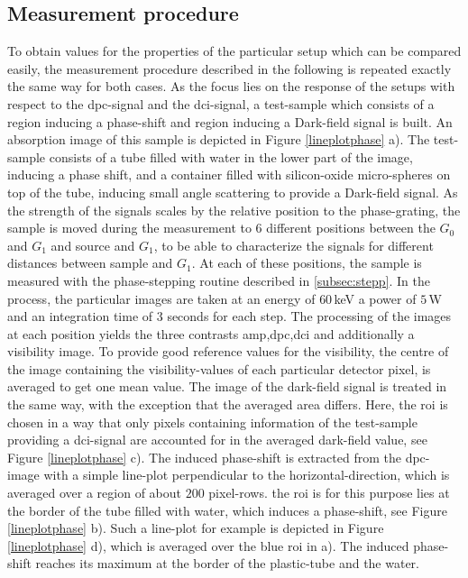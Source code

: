 \subsection{Measurement procedure}\label{subsec:interfemeasureproc}
To obtain values for the properties of the particular setup which can be compared easily, the measurement procedure described in the following is repeated exactly the same way for both cases. As the focus lies on the response of the setups with respect to the \gls{dpc}-signal and the \gls{dci}-signal, a test-sample which consists of a region inducing a phase-shift and region inducing a Dark-field signal is built. An absorption image of this sample is depicted in Figure \ref{lineplotphase} a). The test-sample consists of a tube filled with water in the lower part of the image, inducing a phase shift, and a container filled with silicon-oxide micro-spheres on top of the tube, inducing small angle scattering to provide a Dark-field signal. As the strength of the signals scales by the relative position to the phase-grating, the sample is moved during the measurement to $6$ different positions between the $G_{0}$ and $G_{1}$ and source and $G_{1}$, to be able to characterize the signals for different distances between sample and $G_{1}$. At each of these positions, the sample is measured with the phase-stepping routine described in \ref{subsec:stepp}. In the process, the particular images are taken at an energy of $60\,$keV a power of $5\,$W and an integration time of $3$ seconds for each step. The processing of the images at each position yields the three contrasts \gls{amp},\gls{dpc},\gls{dci} and additionally a visibility image.
To provide good reference values for the visibility, the centre of the image containing the visibility-values of each particular detector pixel, is averaged to get one mean value. The image of the dark-field signal is treated in the same way, with the exception that the averaged area differs. Here, the \gls{roi} is chosen in a way that only pixels containing information of the test-sample providing a \gls{dci}-signal are accounted for in the averaged dark-field value, see Figure \ref{lineplotphase} c). The induced phase-shift is extracted from the \gls{dpc}-image with a simple line-plot perpendicular to the horizontal-direction, which is averaged over a region of about $200$ pixel-rows. the \gls{roi} is for this purpose lies at the border of the tube filled with water, which induces a phase-shift, see Figure \ref{lineplotphase} b). Such a line-plot for example is depicted in Figure \ref{lineplotphase} d), which is averaged over the blue \gls{roi} in a). The induced phase-shift reaches its maximum at the border of the plastic-tube and the water. 
